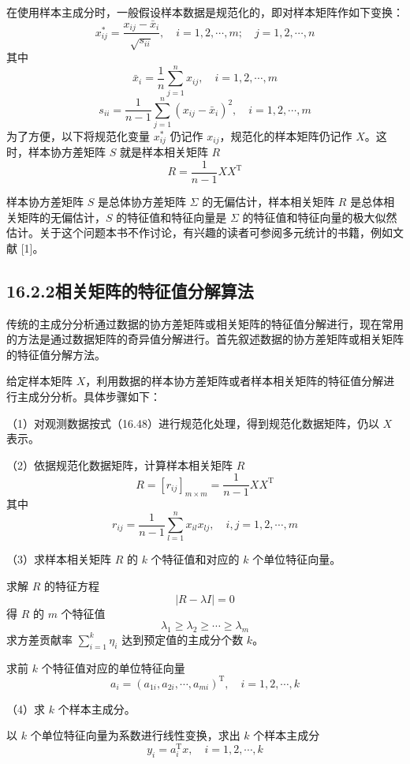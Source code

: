 \documentclass[UTF8, 12pt, fontset=fandol, oneside]{ctexart}
\begin{document}
在使用样本主成分时，一般假设样本数据是规范化的，即对样本矩阵作如下变换：
\begin{equation}
x_{ij}^*=\frac{x_{ij}-\bar x_i}{\sqrt{s_{ii}}},\quad i=1,2,\cdots,m;\quad j=1,2,\cdots,n
\tag{16.48}
\end{equation}
其中
\[
\bar x_i=\frac{1}{n}\sum_{j=1}^n x_{ij},\quad i=1,2,\cdots,m
\]
\[
s_{ii}=\frac{1}{n-1}\sum_{j=1}^n(x_{ij}-\bar x_i)^2,\quad i=1,2,\cdots,m
\]
为了方便，以下将规范化变量 $x_{ij}^*$ 仍记作 $x_{ij}$，规范化的样本矩阵仍记作 $X$。这时，样本协方差矩阵 $S$ 就是样本相关矩阵 $R$
\begin{equation}
R=\frac{1}{n-1}XX^{\mathrm{T}}
\tag{16.49}
\end{equation}

样本协方差矩阵 $S$ 是总体协方差矩阵 $\Sigma$ 的无偏估计，样本相关矩阵 $R$ 是总体相关矩阵的无偏估计，$S$ 的特征值和特征向量是 $\Sigma$ 的特征值和特征向量的极大似然估计。关于这个问题本书不作讨论，有兴趣的读者可参阅多元统计的书籍，例如文献 [1]。

\subsection*{16.2.2\quad 相关矩阵的特征值分解算法}

传统的主成分分析通过数据的协方差矩阵或相关矩阵的特征值分解进行，现在常用的方法是通过数据矩阵的奇异值分解进行。首先叙述数据的协方差矩阵或相关矩阵的特征值分解方法。

给定样本矩阵 $X$，利用数据的样本协方差矩阵或者样本相关矩阵的特征值分解进行主成分分析。具体步骤如下：

（1）对观测数据按式（16.48）进行规范化处理，得到规范化数据矩阵，仍以 $X$ 表示。

（2）依据规范化数据矩阵，计算样本相关矩阵 $R$
\[
R=[r_{ij}]_{m\times m}=\frac{1}{n-1}XX^{\mathrm{T}}
\]
其中
\[
r_{ij}=\frac{1}{n-1}\sum_{l=1}^n x_{il}x_{lj},\quad i,j=1,2,\cdots,m
\]

（3）求样本相关矩阵 $R$ 的 $k$ 个特征值和对应的 $k$ 个单位特征向量。

求解 $R$ 的特征方程
\[
|R-\lambda I|=0
\]
得 $R$ 的 $m$ 个特征值
\[
\lambda_1\geqslant\lambda_2\geqslant\cdots\geqslant\lambda_m
\]
求方差贡献率 $\sum_{i=1}^k\eta_i$ 达到预定值的主成分个数 $k$。

求前 $k$ 个特征值对应的单位特征向量
\[
a_i=(a_{1i},a_{2i},\cdots,a_{mi})^{\mathrm{T}},\quad i=1,2,\cdots,k
\]

（4）求 $k$ 个样本主成分。

以 $k$ 个单位特征向量为系数进行线性变换，求出 $k$ 个样本主成分
\begin{equation}
y_i=a_i^{\mathrm{T}}x,\quad i=1,2,\cdots,k
\tag{16.50}
\end{equation}
\end{document}
